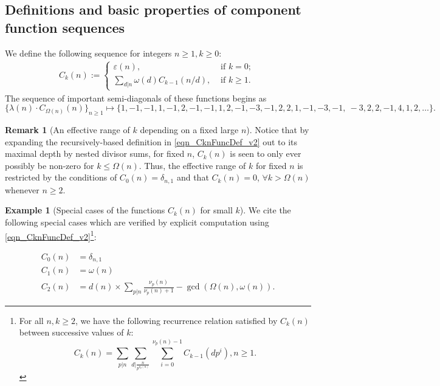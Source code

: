 \documentclass[11pt,reqno,a4letter]{article}
\numberwithin{figure}{section}
\numberwithin{table}{section}
\newcommand{\seqnum}[1]{\href{http://oeis.org/#1}{\color{ProcessBlue}{\underline{#1}}}}
\theoremstyle{plain}
\numberwithin{theorem}{section}
\theoremstyle{definition}
\newtheorem{example}[theorem]{Example}
\newtheorem{remark}[theorem]{Remark}
\newcommand{\NBRef}[1]{}
\begin{document}
\subsection{Definitions and basic properties of component function sequences} 

We define the following sequence for integers $n \geq 1, k \geq 0$: 
\begin{align} 
\label{eqn_CknFuncDef_v2} 
C_k(n) := \begin{cases} 
     \varepsilon(n), & \text{ if $k = 0$; } \\ 
     \sum\limits_{d|n} \omega(d) C_{k-1}(n/d), & \text{ if $k \geq 1$. } 
     \end{cases} 
\end{align} 
The sequence of important semi-diagonals of these functions begins as 
\cite[\seqnum{A008480}]{OEIS} 
\[
\{\lambda(n) \cdot C_{\Omega(n)}(n) \}_{n \geq 1} \mapsto \{
     1, -1, -1, 1, -1, 2, -1, -1, 1, 2, -1, -3, -1, 2, 2, 1, -1, -3, -1, \
     -3, 2, 2, -1, 4, 1, 2, \ldots \}. 
\]

\begin{remark}[An effective range of $k$ depending on a fixed large $n$]
Notice that by expanding the recursively-based definition in \eqref{eqn_CknFuncDef_v2} 
out to its maximal depth by nested divisor sums, for fixed $n$, $C_k(n)$ is seen to 
only ever possibly be non-zero for $k \leq \Omega(n)$. 
Thus, the effective range of $k$ for fixed $n$ is restricted by the 
conditions of $C_0(n) = \delta_{n,1}$ and that $C_k(n) = 0$, $\forall k > \Omega(n)$ 
whenever $n \geq 2$. 
\end{remark} 

\begin{example}[Special cases of the functions $C_k(n)$ for small $k$] 
\label{example_SpCase_Ckn} 
We cite the following special cases which are verified by 
explicit computation using \eqref{eqn_CknFuncDef_v2}\footnote{ 
     For all $n,k \geq 2$, we have the following recurrence 
     relation satisfied by $C_k(n)$ between successive values of $k$: 
     \begin{equation*}
     C_k(n) = \sum_{p|n} \sum_{d\rvert\frac{n}{p^{\nu_p(n)}}} \sum_{i=0}^{\nu_p(n)-1} 
          C_{k-1}\left(dp^i\right), n \geq 1. 
     \end{equation*}
}: 
\NBRef{A07-2020-04-26} 
\begin{align*} 
C_0(n) & = \delta_{n,1} \\ 
C_1(n) & = \omega(n) \\ 
C_2(n) & = d(n) \times \sum_{p|n} \frac{\nu_p(n)}{\nu_p(n)+1} - \gcd\left(\Omega(n), \omega(n)\right). 
\end{align*} 
\end{example} 
\end{document}
